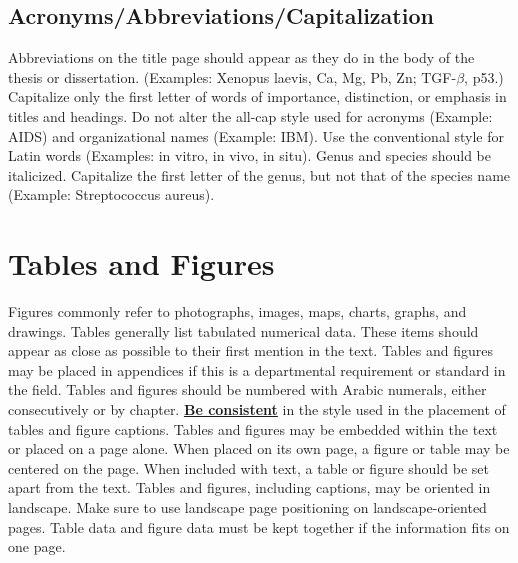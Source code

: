 \subsection{Acronyms/Abbreviations/Capitalization}
Abbreviations on the title page should appear as they do in the body of the thesis or dissertation. (Examples: Xenopus laevis, Ca, Mg, Pb, Zn; TGF-$\beta$, p53.) Capitalize only the first letter of words of importance, distinction, or emphasis in titles and headings. Do not alter the all-cap style used for acronyms (Example: AIDS) and organizational names (Example: IBM). Use the conventional style for Latin words (Examples: in vitro, in vivo, in situ). Genus and species should be italicized. Capitalize the first letter of the genus, but not that of the species name (Example: Streptococcus aureus).


\section{Tables and Figures}
Figures commonly refer to photographs, images, maps, charts, graphs, and drawings. Tables generally list tabulated numerical data. These items should appear as close as possible to their first mention in the text. Tables and figures may be placed in appendices if this is a departmental requirement or standard in the field. Tables and figures should be numbered with Arabic numerals, either consecutively or by chapter. \underline{\textbf{Be consistent}} in the style used in the placement of tables and figure captions. Tables and figures may be embedded within the text or placed on a page alone. When placed on its own page, a figure or table may be centered on the page. When included with text, a table or figure should be set apart from the text. Tables and figures, including captions, may be oriented in landscape. Make sure to use landscape page positioning on landscape-oriented pages. Table data and figure data must be kept together if the information fits on one page.












